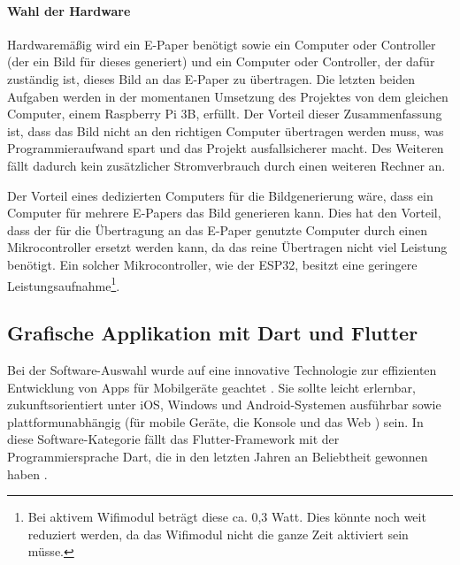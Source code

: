 \documentclass[10pt]{article}
\begin{document}
\paragraph{Wahl der Hardware}\label{wahl-hardware}
Hardwaremäßig wird ein E-Paper benötigt sowie ein Computer oder  Controller (der ein Bild für dieses generiert) und ein Computer oder Controller, der dafür zuständig ist, dieses Bild an das E-Paper zu übertragen. Die letzten beiden Aufgaben werden in der momentanen Umsetzung des Projektes von dem gleichen Computer, einem Raspberry Pi 3B, erfüllt. Der Vorteil dieser Zusammenfassung ist, dass das Bild nicht an den richtigen Computer übertragen werden muss, was Programmieraufwand spart und das Projekt ausfallsicherer macht. Des Weiteren fällt dadurch kein zusätzlicher Stromverbrauch durch einen weiteren Rechner an. 

Der Vorteil eines dedizierten Computers für die Bildgenerierung wäre, dass ein Computer für mehrere E-Papers das Bild generieren kann. Dies hat den Vorteil, dass der für die Übertragung an das E-Paper genutzte Computer durch einen Mikrocontroller ersetzt werden kann, da das reine Übertragen nicht viel Leistung benötigt. Ein solcher Mikrocontroller, wie der ESP32, besitzt eine geringere Leistungsaufnahme\footnote{Bei aktivem Wifimodul beträgt diese ca. 0,3 Watt. Dies könnte noch weit reduziert werden, da das Wifimodul nicht die ganze Zeit aktiviert sein müsse.}\cite{esp32-power}.

\subsection{Grafische Applikation mit Dart und Flutter}


Bei der Software-Auswahl wurde auf eine innovative Technologie zur effizienten Entwicklung von Apps für Mobilgeräte geachtet \cite[S. 1]{Meiller}. Sie sollte leicht erlernbar, zukunftsorientiert unter iOS, Windows und Android-Systemen ausführbar sowie plattformunabhängig (für mobile Geräte, die Konsole und das Web \cite[S. 8]{Meiller}) sein. In diese Software-Kategorie fällt das Flutter-Framework mit der Programmiersprache Dart, die in den letzten Jahren an Beliebtheit gewonnen haben \cite{Most_Loved_Languages2018,Most_Loved_Languages2019,Most_Loved_Languages2020,Most_Loved_Frameworks_2020,Most_Loved_Frameworks_2021}.
\end{document}
